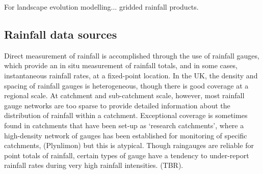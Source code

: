For landscape evolution modelling... gridded rainfall products.

\subsection{Rainfall data sources}
Direct measurement of rainfall is accomplished through the use of rainfall gauges, which provide an in situ measurement of rainfall totals, and in some cases, instantaneous rainfall rates, at a fixed-point location. In the UK, the density and spacing of rainfall gauges is heterogeneous, though there is good coverage at a regional scale. At catchment and sub-catchment scale, however, most rainfall gauge networks are too sparse to provide detailed information about the distribution of rainfall within a catchment. Exceptional coverage is sometimes found in catchments that have been set-up as `research catchments', where a high-density network of gauges has been established for monitoring of specific catchments, (Plynlimon) but this is atypical. Though raingauges are reliable for point totals of rainfall, certain types of gauge have a tendency to under-report rainfall rates during very high rainfall intensities. (TBR). 

